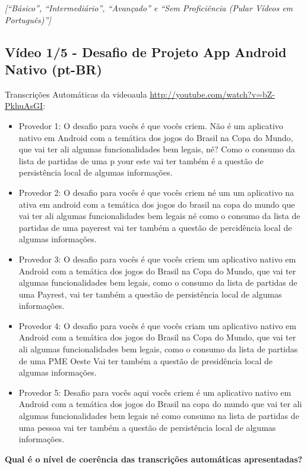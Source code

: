 \noindent
\textit{[``Básico'', ``Intermediário'', ``Avançado'' e ``Sem Proficiência (Pular Vídeos em Português)'']}

\subsection{Vídeo 1/5 - Desafio de Projeto App Android Nativo (pt-BR)}

\noindent
Transcrições Automáticas da videoaula \url{http://youtube.com/watch?v=bZ-PkhuAsGI}:

\begin{itemize}
    \item Provedor 1: O desafio para vocês é que vocês criem. Não é um aplicativo nativo em Android com a temática dos jogos do Brasil na Copa do Mundo, que vai ter ali algumas funcionalidades bem legais, né? Como o consumo da lista de partidas de uma p your este vai ter também é a questão de persistência local de algumas informações.
    \item Provedor 2: O desafio para vocês é que vocês criem né um um aplicativo na ativa em android com a temática dos jogos do brasil na copa do mundo que vai ter ali algumas funcionalidades bem legais né como o consumo da lista de partidas de uma payerest vai ter também a questão de percidência local de algumas informações.
    \item Provedor 3: O desafio para vocês é que vocês criem um aplicativo nativo em Android com a temática dos jogos do Brasil na Copa do Mundo, que vai ter algumas funcionalidades bem legais, como o consumo da lista de partidas de uma Payrest, vai ter também a questão de persistência local de algumas informações.
    \item Provedor 4: O desafio para vocês é que vocês criam um aplicativo nativo em Android com a temática dos jogos do Brasil na Copa do Mundo, que vai ter ali algumas funcionalidades bem legais, como o consumo da lista de partidas de uma PME Oeste Vai ter também a questão de presidência local de algumas informações.
    \item Provedor 5: Desafio para vocês aqui vocês criem é um aplicativo nativo em Android com a temática dos jogos do Brasil na copa do mundo que vai ter ali algumas funcionalidades bem legais né como consumo na lista de partidas de uma pessoa vai ter também a questão de persistência local de algumas informações.
\end{itemize}

\noindent
\textbf{Qual é o nível de coerência das transcrições automáticas apresentadas?}

